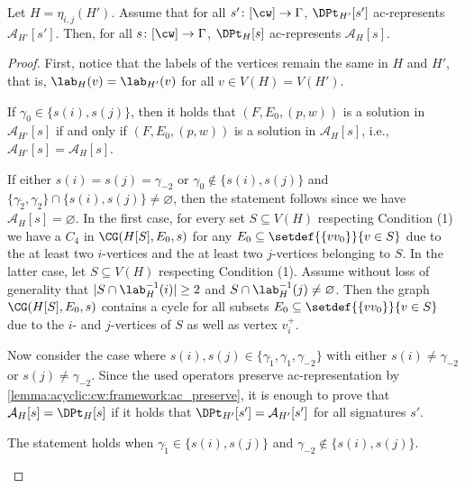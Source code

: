\begin{lemma}\label{lemma:acyclic:cw:join-correctness}
    Let $H = \eta_{i,j}(H')$.
    Assume that for all $s' \colon [\cw] \to \Gamma$,
    $\DPt_{H'}[s']$ ac-represents $\mathcal{A}_{H'}[s']$.
    Then, for all $s \colon [\cw] \to \Gamma$,
    $\DPt_H[s]$ ac-represents $\mathcal{A}_{H}[s]$.
\end{lemma}

\begin{proof}
	First, notice that the labels of the vertices remain the same in $H$ and $H'$,
	that is, $\lab_H(v) = \lab_{H'}(v)$ for all $v \in V(H) = V(H')$.

	If $\gamma_0 \in \{s(i), s(j)\}$, then it holds that
    $(F,E_0,(p,w))$ is a solution in $\mathcal{A}_{H'}[s]$ if and only if
    $(F,E_0,(p,w))$ is a solution in $\mathcal{A}_H[s]$, i.e.,
    $\mathcal{A}_{H'}[s]=\mathcal{A}_H[s]$.

	If either $s(i)=s(j)=\gamma_{-2}$ or $\gamma_0 \notin \{s(i),s(j)\}$ and $\{\gamma_{\tilde{2}},\gamma_{2}\} \cap \{s(i),s(j)\} \neq \varnothing$,
	then the statement follows since we have $\mathcal{A}_H[s]=\varnothing$.
	In the first case, for every set $S \subseteq V(H)$ respecting Condition (1)
	we have a $C_4$ in $\CG(H[S],E_0,s)$ for any $E_0 \subseteq \setdef{\{v v_0\}}{v \in S}$
	due to the at least two $i$-vertices and the at least two $j$-vertices belonging to $S$.
	In the latter case, let $S \subseteq V(H)$ respecting Condition (1).
	Assume without loss of generality that $|S \cap \lab^{-1}_H(i)| \ge 2$
	and $S \cap \lab^{-1}_H(j) \neq \varnothing$.
	Then the graph $\CG(H[S],E_0,s)$ contains a cycle for all subsets $E_0 \subseteq \setdef{\{v v_0\}}{v \in S}$
	due to the $i$- and $j$-vertices of $S$ as well as vertex $v^+_i$.


	Now consider the case where $s(i),s(j) \in \{\gamma_{\tilde{1}}, \gamma_{1}, \gamma_{-2}\}$ with
    either $s(i) \neq \gamma_{-2}$ or $s(j) \neq \gamma_{-2}$.
	Since the used operators preserve ac-representation by \cref{lemma:acyclic:cw:framework:ac_preserve},
    it is enough to prove that $\mathcal{A}_H[s] = \DPt_H[s]$ if it holds that $\DPt_{H'}[s'] = \mathcal{A}_{H'}[s']$ for all signatures $s'$.


	\begin{claim}
		The statement holds when $\gamma_{\tilde{1}} \in \{s(i), s(j)\}$ and $\gamma_{-2} \notin \{s(i), s(j)\}$.
	\end{claim}


\end{proof}
